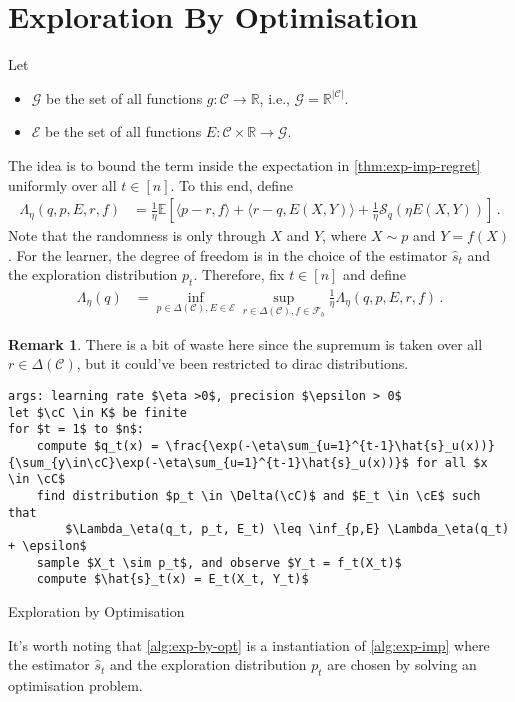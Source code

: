 \documentclass{article}
\theoremstyle{plain}
\theoremstyle{definition}
\newtheorem{remark}[theorem]{Remark}
\theoremstyle{remark}
\newcommand{\R}{\mathbb R}
\newcommand{\E}{\mathbb E}
\newcommand{\cE}{\mathcal E}
\newcommand{\cF}{\mathcal F}
\newcommand{\cS}{\mathcal S}
\newcommand{\cC}{\mathcal C}
\newcommand{\cG}{\mathcal G}
\theoremstyle{definition}
\begin{document}
\section{Exploration By Optimisation}
Let
\begin{itemize}
    \item $\cG$ be the set of all functions $g:\cC \to \R$, i.e., $\cG = \R^{|\cC|}$.
    \item $\cE$ be the set of all functions $E: \cC \times \R \to \cG$.
\end{itemize}
The idea is to bound the term inside the expectation in \cref{thm:exp-imp-regret} uniformly over all $t \in [n]$.
To this end, define
\begin{align*}
    \Lambda_\eta(q, p, E, r, f) & =
    \frac{1}{\eta}
    \E\left[
        \langle p - r, f \rangle
        + \langle r - q, E(X, Y) \rangle
        + \frac{1}{\eta} \cS_q(\eta E(X, Y))
        \right]\,.
\end{align*}
Note that the randomness is only through $X$ and $Y$, where $X \sim p$ and $Y = f(X)$.
For the learner, the degree of freedom is in the choice of the estimator $\hat{s}_t$ and the exploration distribution $p_t$.
Therefore, fix $t \in [n]$ and define
\begin{align*}
    \Lambda_\eta(q) & =
    \inf_{p \in \Delta(\cC), E \in \cE}
    \sup_{r \in \Delta(\cC), f \in \cF_b} \frac{1}{\eta}
    \Lambda_\eta(q, p, E, r, f)\,.
\end{align*}
\begin{remark}
    There is a bit of waste here since the supremum is taken over all $r \in \Delta(\cC)$, but it could've been restricted to dirac distributions.
\end{remark}

\begin{algorithm}[h!]
    \begin{minipage}{12cm}
        \begin{mdframed}
            \begin{lstlisting}
args: learning rate $\eta >0$, precision $\epsilon > 0$
let $\cC \in K$ be finite
for $t = 1$ to $n$:
    compute $q_t(x) = \frac{\exp(-\eta\sum_{u=1}^{t-1}\hat{s}_u(x))}{\sum_{y\in\cC}\exp(-\eta\sum_{u=1}^{t-1}\hat{s}_u(x))}$ for all $x \in \cC$
    find distribution $p_t \in \Delta(\cC)$ and $E_t \in \cE$ such that
        $\Lambda_\eta(q_t, p_t, E_t) \leq \inf_{p,E} \Lambda_\eta(q_t) + \epsilon$
    sample $X_t \sim p_t$, and observe $Y_t = f_t(X_t)$
    compute $\hat{s}_t(x) = E_t(X_t, Y_t)$
\end{lstlisting}
            \caption{Exploration by Optimisation}\label{alg:exp-by-opt}
        \end{mdframed}
    \end{minipage}
\end{algorithm}
It's worth noting that \cref{alg:exp-by-opt} is a instantiation of \cref{alg:exp-imp} where the estimator $\hat{s}_t$ and the exploration distribution $p_t$ are chosen by solving an optimisation problem.
\end{document}
